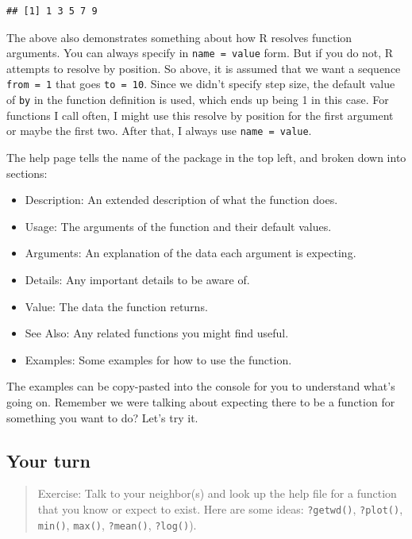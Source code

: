 \documentclass[]{book}
\providecommand{\tightlist}{%
  \setlength{\itemsep}{0pt}\setlength{\parskip}{0pt}}
\theoremstyle{definition}
\theoremstyle{definition}
\theoremstyle{definition}
\theoremstyle{remark}
\begin{document}
\begin{verbatim}
## [1] 1 3 5 7 9
\end{verbatim}

The above also demonstrates something about how R resolves function
arguments. You can always specify in \texttt{name\ =\ value} form. But
if you do not, R attempts to resolve by position. So above, it is
assumed that we want a sequence \texttt{from\ =\ 1} that goes
\texttt{to\ =\ 10}. Since we didn't specify step size, the default value
of \texttt{by} in the function definition is used, which ends up being 1
in this case. For functions I call often, I might use this resolve by
position for the first argument or maybe the first two. After that, I
always use \texttt{name\ =\ value}.

The help page tells the name of the package in the top left, and broken
down into sections:

\begin{itemize}
\tightlist
\item
  Description: An extended description of what the function does.
\item
  Usage: The arguments of the function and their default values.
\item
  Arguments: An explanation of the data each argument is expecting.
\item
  Details: Any important details to be aware of.
\item
  Value: The data the function returns.
\item
  See Also: Any related functions you might find useful.
\item
  Examples: Some examples for how to use the function.
\end{itemize}

The examples can be copy-pasted into the console for you to understand
what's going on. Remember we were talking about expecting there to be a
function for something you want to do? Let's try it.

\subsection{Your turn}\label{your-turn}

\begin{quote}
Exercise: Talk to your neighbor(s) and look up the help file for a
function that you know or expect to exist. Here are some ideas:
\texttt{?getwd()}, \texttt{?plot()}, \texttt{min()}, \texttt{max()},
\texttt{?mean()}, \texttt{?log()}).
\end{quote}
\end{document}
